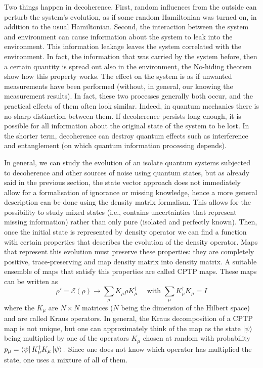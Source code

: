 Two things happen in decoherence. First, random influences from the outside can perturb the system's evolution, as if some random Hamiltonian was turned on, in addition to the usual Hamiltonian. Second, the interaction between the system and environment can cause information about the system to leak into the environment. This information leakage leaves the system correlated with the environment. In fact, the information that was carried by the system before, then a certain quantity is spread out also in the environment, the No-hiding theorem show how this property works. The effect on the system is as if unwanted measurements have been performed (without, in general, our knowing the measurement results).
In fact, these two processes generally both occur, and the practical effects of them often look similar. Indeed, in quantum mechanics there is no sharp distinction between them. If decoherence persists long enough, it is possible for all information about the original state of the system to be lost. In the shorter term, decoherence can destroy quantum effects such as interference and entanglement (on which quantum information processing depends).

In general, we can study the evolution of an isolate quantum systems subjected to decoherence and other sources of noise using quantum states, but as already said in the previous section, the state vector approach does not immediately allow for a formalisation of ignorance or missing knowledge, hence a more general description can be done using the density matrix formalism. This allows for the possibility to study mixed states (i.e., contains uncertainties that represent missing information) rather than only pure (isolated and perfectly known).
Then, once the initial state is represented by density operator we can find a function with certain properties that describes the evolution of the density operator.
Maps that represent this evolution must preserve these properties: they are completely positive, trace-preserving and map density matrix into density matrix.
A suitable ensemble of maps that satisfy this properties are called CPTP maps. These maps can be written as
$$
\rho' = \mathcal{E}(\rho) \rightarrow \sum_{\mu} K_{\mu} \rho K_{\mu}^{\dagger} \quad \text { with } \sum_{\mu} K_{\mu}^{\dagger} K_{\mu}=I
$$
where the $K_{\mu}$ are $N \times N$ matrices ($N$ being the dimension of the Hilbert space) and are called Kraus operators. 
In general, the Kraus decomposition of a CPTP map is not unique, but one can approximately think of the map as the state $|\psi\rangle$ being multiplied by one of the operators $K_{\mu}$ chosen at random with probability $p_{\mu}=\bra{\psi} K_{\mu}^{\dagger} K_{\mu}\ket{\psi} .$ Since one does not know which operator has multiplied the state, one uses a mixture of all of them.

